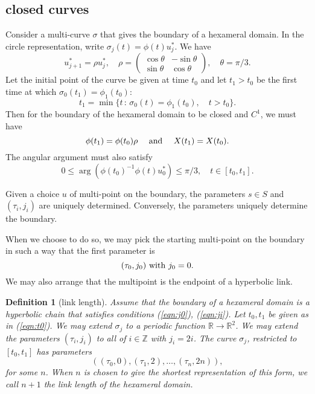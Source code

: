 \documentclass[11pt]{amsart}
\newtheorem{definition}{Definition}
\newcommand{\ring}[1]{\mathbb{#1}}
\def\rZ{{\ring{Z}}}
\def\rR{{\ring{R}}}
\def\ta{{\tau}}
\def\mid{\,:\,}
\begin{document}
\subsection{closed curves}

Consider a multi-curve $\sigma$ that gives the boundary of a hexameral domain.  In the circle
representation, 
write $\sigma_j(t) = \phi(t)u^*_j$.  We have
$$u^*_{j+1} = \rho u^*_j,\quad \rho=\left(\begin{array}{ccc} \cos\theta & -\sin\theta\\ \sin\theta & \cos\theta\end{array}\right),\quad \theta=\pi/3.$$
Let the initial point of the curve be given at time $t_0$ and let $t_1>t_0$ be the first time
at which $\sigma_0(t_1) = \phi_1(t_0)$:
\begin{equation}\label{eqn:t0}
t_1 = \min \{ t \mid \sigma_0(t) = \phi_1(t_0), \quad t>t_0\}.
\end{equation} 
Then for the boundary of the hexameral domain to be closed
and $C^1$, we must have
\begin{equation}\label{eqn:closed}
\phi(t_1) = \phi(t_0)\rho\quad\hbox{ and }\quad X(t_1) = X(t_0).
\end{equation}
The angular argument must also satisfy
\begin{equation}\label{eqn:arg}
0\le \arg (\phi(t_0)^{-1}\phi(t)u^*_0) \le \pi/3,\quad t\in[t_0,t_1].
\end{equation}

Given a choice $u$ of multi-point on the boundary, the parameters $s\in S$ and $(\ta_i,j_i)$
are uniquely determined.  Conversely, the parameters uniquely determine the boundary.

When we choose to do so, we may pick the starting multi-point on
the boundary in such a way
that the first parameter is
\begin{equation}\label{eqn:j0}
(\ta_0,j_0) \hbox{ with } j_0=0.
\end{equation}  
We may also arrange
that the multipoint is the endpoint of a hyperbolic link.

\begin{definition}[link length]
Assume that the boundary of a hexameral domain is a hyperbolic
chain that satisfies conditions (\ref{eqn:j0}), (\ref{eqn:ji}).
Let $t_0,t_1$ be given as in (\ref{eqn:t0}).  We may extend
$\sigma_j$ to a periodic function $\rR\to\rR^2$.  We may extend
the parameters $(\ta_i,j_i)$ to all of $i\in\rZ$ with $j_i = 2i$.
The curve $\sigma_j$, restricted to $[t_0,t_1]$ has parameters
$$
((\ta_0,0),(\ta_1,2),\ldots,(\ta_n,2n)),
$$
for some $n$.  When $n$ is chosen to give the shortest representation of this form, we call $n+1$ the {\it link length} of the hexameral domain.
\end{definition}
\end{document}
